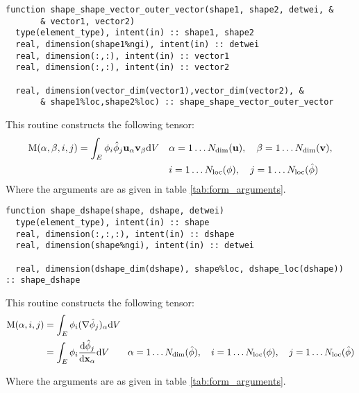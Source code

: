 \documentclass[a4paper, 11pt]{book}
\begin{document}

\begin{lstlisting}
function shape_shape_vector_outer_vector(shape1, shape2, detwei, &
       & vector1, vector2)
  type(element_type), intent(in) :: shape1, shape2
  real, dimension(shape1%ngi), intent(in) :: detwei
  real, dimension(:,:), intent(in) :: vector1
  real, dimension(:,:), intent(in) :: vector2

  real, dimension(vector_dim(vector1),vector_dim(vector2), &
       & shape1%loc,shape2%loc) :: shape_shape_vector_outer_vector
\end{lstlisting}

This routine constructs the following tensor:
\begin{equation}
  \begin{split}
    \mathrm{M}(\alpha,\beta,i,j)=\int_E \phi_{i}\hat{\phi}_{j}\mathbf{u}_\alpha\mathbf{v}_\beta\mathrm{d} V\quad
    &\alpha=1\ldots N_\mathrm{dim}(\mathbf{u}),\quad \beta=1\ldots N_\mathrm{dim}(\mathbf{v}),\\
    &i=1\ldots N_\mathrm{loc}(\phi),\quad j=1\ldots N_\mathrm{loc}(\hat{\phi})
  \end{split}
\end{equation}
Where the arguments are as given in table \ref{tab:form_arguments}.


\begin{lstlisting}
function shape_dshape(shape, dshape, detwei)
  type(element_type), intent(in) :: shape
  real, dimension(:,:,:), intent(in) :: dshape
  real, dimension(shape%ngi), intent(in) :: detwei

  real, dimension(dshape_dim(dshape), shape%loc, dshape_loc(dshape)) :: shape_dshape
\end{lstlisting}
This routine constructs the following tensor:
\begin{equation}
  \begin{split}
    \mathrm{M}(\alpha,i,j)&=\int_E \phi_{i}(\nabla\hat{\phi}_j)_\alpha\mathrm{d} V\\
    &=\int_E \phi_{i}\frac{\mathrm{d}\hat{\phi}_j}{\mathrm{d}\mathbf{x}_\alpha}\mathrm{d} V\quad
  \quad \alpha=1\ldots N_\mathrm{dim}(\hat{\phi}),\quad i=1\ldots N_\mathrm{loc}(\phi),\quad j=1\ldots N_\mathrm{loc}(\hat{\phi})
  \end{split}
\end{equation}

Where the arguments are as given in table \ref{tab:form_arguments}.
\end{document}
